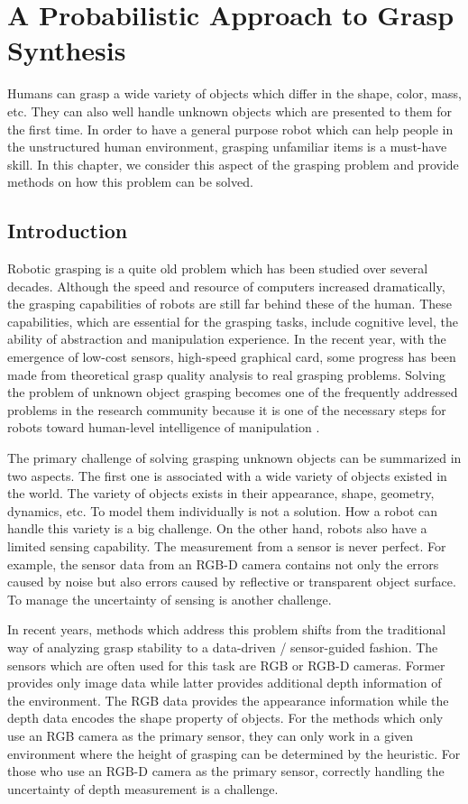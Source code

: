 \chapter{A Probabilistic Approach to Grasp Synthesis}
\label{chapter:gs}
Humans can grasp a wide variety of objects which differ in the shape, color, mass, etc. They can also well handle unknown objects which are presented to them for the first time. In order to have a general purpose robot which can help people in the unstructured human environment, grasping unfamiliar items is a must-have skill. In this chapter, we consider this aspect of the grasping problem and provide methods on how this problem can be solved. 

\section{Introduction}
Robotic grasping is a quite old problem which has been studied over several decades. Although the speed and resource of computers increased dramatically, the grasping capabilities of robots are still far behind these of the human. These capabilities, which are essential for the grasping tasks, include cognitive level, the ability of abstraction and manipulation experience. In the recent year, with the emergence of low-cost sensors, high-speed graphical card, some progress has been made from theoretical grasp quality analysis to real grasping problems. Solving the problem of unknown object grasping becomes one of the frequently addressed problems in the research community because it is one of the necessary steps for robots toward human-level intelligence of manipulation \cite{Mahler2017Dex20}. 

The primary challenge of solving grasping unknown objects can be summarized in two aspects. The first one is associated with a wide variety of objects existed in the world. The variety of objects exists  in their appearance, shape, geometry, dynamics, etc. To model them individually is not a solution. How a robot can handle this variety is a big challenge. On the other hand, robots also have a limited sensing capability. The measurement from a sensor is never perfect. For example, the sensor data from an RGB-D camera contains not only the errors caused by noise but also errors caused by reflective or transparent object surface. To manage the uncertainty of sensing is another challenge. 
  
In recent years, methods which address this problem shifts from the traditional way of analyzing grasp stability to a data-driven / sensor-guided fashion. The  sensors which are often used for this task are RGB or RGB-D cameras. Former provides only image data while latter provides additional depth information of the environment. The RGB data provides the appearance information while the depth data encodes the shape property of objects. For the methods which only use an RGB camera as the primary sensor, they can only work in a given environment where the height of  grasping can be determined by the heuristic. For those who use an RGB-D camera as the primary sensor, correctly handling the uncertainty of depth measurement is a challenge. 

